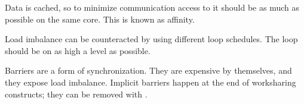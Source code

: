Data is cached, so to minimize communication
access to it should be as much as possible
on the same core. This is known as affinity.

Load imbalance can be counteracted by using
different loop schedules. The loop should be
on as high a level as possible.

Barriers are a form of synchronization.
They are expensive by themselves, and they
expose load imbalance. Implicit barriers happen
at the end of worksharing constructs; they
can be removed with .




\endinput

\Level 0 {Idioms}

\Level 1 {While loops}

\verbatimsnippet{linkedlist}

